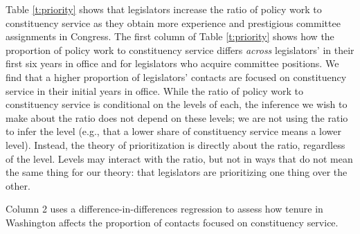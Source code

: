 \documentclass[12pt]{article}
\begin{document}
Table \ref{t:priority} shows that legislators increase the ratio of policy work to constituency service as they obtain more experience and prestigious committee assignments in Congress. The first column of Table \ref{t:priority} shows how the proportion of policy work to constituency service differs \textit{across} legislators' in their first six years in office and for legislators who acquire committee positions. We find that a higher proportion of legislators' contacts are focused on constituency service in their initial years in office.
While the ratio of policy work to constituency service is conditional on the levels of each, the inference we wish to make about the ratio does not depend on these levels; we are not using the ratio to infer the level (e.g., that a lower share of constituency service means a lower level). Instead, the theory of prioritization is directly about the ratio, regardless of the level. Levels may interact with the ratio, but not in ways that do not mean the same thing for our theory: that legislators are prioritizing one thing over the other. 

Column 2 uses a difference-in-differences regression to assess how tenure in Washington affects the proportion of contacts focused on constituency service. 



\end{document}
